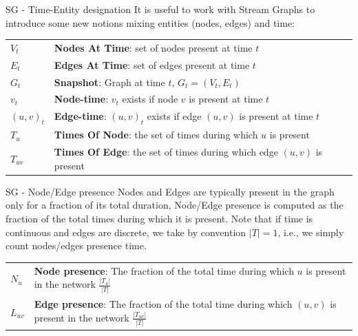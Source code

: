 \documentclass[a4paper,11pt]{book}
\begin{document}
\begin{textbox}{SG - Time-Entity designation}
It is useful to work with Stream Graphs to introduce some new notions mixing entities (nodes, edges) and time:


\begin{tabular}{p{}|p{}}\scriptsize
$V_{t}$ & \textbf{Nodes At Time}: set of nodes present at time $t$\\
$E_{t}$ & \textbf{Edges At Time}: set of edges present at time $t$\\
$G_t$ & \textbf{Snapshot}: Graph at time $t$, $G_t=(V_t,E_t)$\\
$v_t$ & \textbf{Node-time}: $v_t$ exists if node $v$ is present at time $t$\\
$(u,v)_t$ & \textbf{Edge-time}: $(u,v)_t$ exists if edge $(u,v)$ is present at time $t$ \\
$T_u$ & \textbf{Times Of Node}: the set of times during which $u$ is present\\
$T_{uv}$ & \textbf{Times Of Edge}: the set of times during which edge $(u,v)$ is present\\

\end{tabular}
\end{textbox}





\begin{textbox}{SG - Node/Edge presence}
Nodes and Edges are typically present in the graph only for a fraction of its total duration, Node/Edge presence is computed as the fraction of the total times during which it is present. Note that if time is continuous and edges are discrete, we take by convention $|T|=1$, i.e., we simply count nodes/edges presence time.


\begin{tabular}{p{}|p{}}\scriptsize

$N_u$ & \textbf{Node presence}: The fraction of the total time during which $u$ is present in the network $\frac{|T_u|}{|T|}$ \\
$L_{uv}$ & \textbf{Edge presence}: The fraction of the total time during which $(u,v)$ is present in the network $\frac{|T_{uv}|}{|T|}$ \\

\end{tabular}
\end{textbox}
\end{document}
